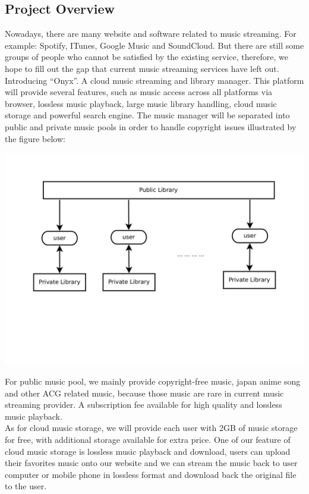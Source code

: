 \documentclass[12pt, a4paper, oneside]{article}
\begin{document}
\subsection{Project Overview}

Nowadays, there are many website and software related to music streaming.
For example: Spotify, ITunes, Google Music and SoundCloud.
But there are still some groups of people who cannot be satisfied by the existing service,
therefore, we hope to fill out the gap that current music streaming services have left out.\\ 

Introducing “Onyx”. A cloud music streaming and library manager. This platform will provide
several features, such as music access across all platforms via browser,
lossless music playback, large music library handling, cloud music storage and
powerful search engine. The music manager will be separated into public and private music pools
in order to handle copyright issues illustrated by the figure below:

\includegraphics[trim = 25mm 60mm 10mm 20mm, clip, width=\textwidth]{fig/media-access}

For public music pool, we mainly provide copyright-free music, japan anime song and 
other ACG related music, because those music are rare in current music streaming provider.
A subscription fee available for high quality and lossless music playback.\\

As for cloud music storage, we will provide each user with 2GB of music storage for free,
with additional storage available for extra price. One of our feature of cloud music storage is
lossless music playback and download, users can upload their favorites music onto our website
and we can stream the music back to user computer or mobile phone in lossless format and
download back the original file to the user.\\
\end{document}
